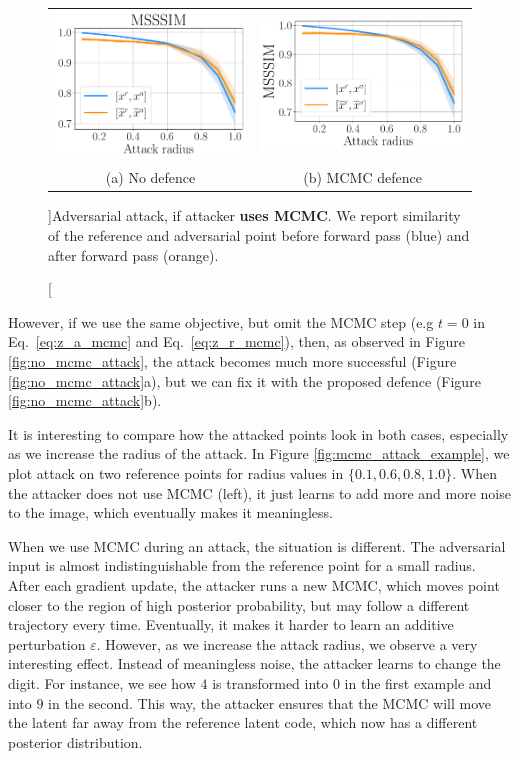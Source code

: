 \begin{figure}[h]
	\centering
	\begin{tabular}{cc}
		\includegraphics[width=0.4\columnwidth]{pics/3_adv_att/attack_mcmc_1_0.pdf} & 
		\includegraphics[width=0.44\columnwidth]{pics/3_adv_att/attack_mcmc_1_100.pdf} \\
		\small{(a) No defence} & \small{(b) MCMC defence} \\
	\end{tabular}
	\caption[][\baselineskip]{Adversarial attack, if attacker \textbf{uses MCMC}. We report similarity of the reference and adversarial point before forward pass (blue) and after forward pass (orange). }
	\label{fig:mcmc_attack}
	\vspace*{2\baselineskip}
\end{figure}

However, if we use the same objective, but omit the MCMC step (e.g $t=0$ in Eq.~\ref{eq:z_a_mcmc} and Eq.~\ref{eq:z_r_mcmc}), then, as observed in Figure \ref{fig:no_mcmc_attack}, the attack becomes much more successful (Figure \ref{fig:no_mcmc_attack}a), but we can fix it with the proposed defence (Figure \ref{fig:no_mcmc_attack}b).

It is interesting to compare how the attacked points look in both cases, especially as we increase the radius of the attack. In Figure \ref{fig:mcmc_attack_example}, we plot attack on two reference points for radius values in $\{0.1, 0.6, 0.8, 1.0\}$. When the attacker does not use MCMC (left), it just learns to add more and more noise to the image, which eventually makes it meaningless. 
 
 When we use MCMC during an attack, the situation is different. The adversarial input is almost indistinguishable from the reference point for a small radius. After each gradient update, the attacker runs a new MCMC, which moves point closer to the region of high posterior probability, but may follow a different trajectory every time. Eventually, it makes it harder to learn an additive perturbation $\varepsilon$. However, as we increase the attack radius, we observe a very interesting effect. Instead of meaningless noise, the attacker learns to change the digit. For instance, we see how $4$ is transformed into $0$ in the first example and into $9$ in the second. This way, the attacker ensures that the MCMC will move the latent far away from the reference latent code, which now has a different posterior distribution.


